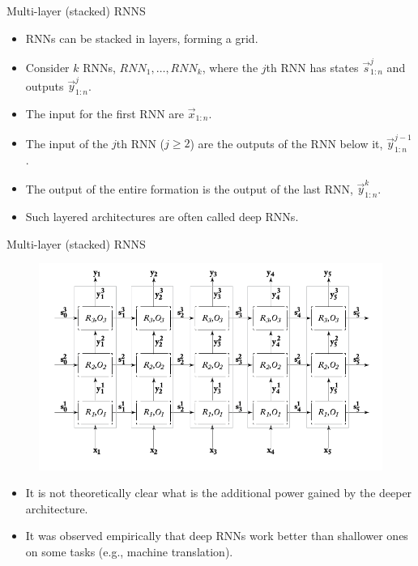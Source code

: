 \documentclass[handout]{beamer}
\begin{document}
\begin{frame}{Multi-layer (stacked) RNNS}
\begin{scriptsize}
\begin{itemize}
\item RNNs can be stacked in layers, forming a grid.
\item Consider $k$ RNNs, $RNN_{1},\dots, RNN_{k}$, where the $j$th RNN has states $\vec{s}_{1:n}^{j}$  and outputs $\vec{y}_{1:n}^{j}$.
\item The input for the first RNN are $\vec{x}_{1:n}$.
\item The input of the $j$th RNN ($j\geq 2$) are the outputs of the RNN below it, $\vec{y}_{1:n}^{j-1}$.
\item The output of the entire formation is the output of the last RNN, $\vec{y}_{1:n}^k$.
\item Such layered architectures are often called deep RNNs.
\end{itemize}
\end{scriptsize}
\end{frame}


\begin{frame}{Multi-layer (stacked) RNNS}
\begin{scriptsize}
  \begin{figure}[h]
        	\includegraphics[scale = 0.35]{pics/stackedRNN.png}
        \end{figure}
\begin{itemize}
\item It is not theoretically clear what is the additional power gained by the deeper architecture.
\item It was observed empirically that deep RNNs work better than shallower ones on some tasks (e.g., machine translation).
\end{itemize}
\end{scriptsize}
\end{frame}
\end{document}
